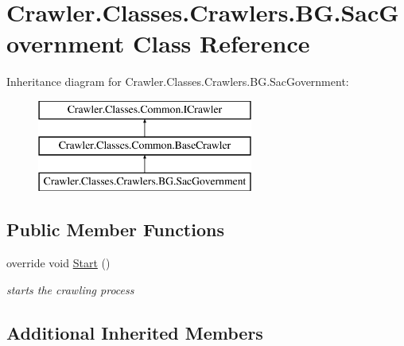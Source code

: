 \hypertarget{class_crawler_1_1_classes_1_1_crawlers_1_1_b_g_1_1_sac_government}{\section{Crawler.\-Classes.\-Crawlers.\-B\-G.\-Sac\-Government Class Reference}
\label{class_crawler_1_1_classes_1_1_crawlers_1_1_b_g_1_1_sac_government}
}
Inheritance diagram for Crawler.\-Classes.\-Crawlers.\-B\-G.\-Sac\-Government\-:\begin{figure}[H]
\begin{center}
\leavevmode
\includegraphics[height=3.000000cm]{class_crawler_1_1_classes_1_1_crawlers_1_1_b_g_1_1_sac_government}
\end{center}
\end{figure}
\subsection*{Public Member Functions}
\begin{DoxyCompactItemize}
\item 
override void \hyperlink{class_crawler_1_1_classes_1_1_crawlers_1_1_b_g_1_1_sac_government_a2ae15cb53f987fbdf4643b5937fa8cb2}{Start} ()
\begin{DoxyCompactList}\small\item\em starts the crawling process \end{DoxyCompactList}\end{DoxyCompactItemize}
\subsection*{Additional Inherited Members}


